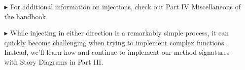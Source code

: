\begin{itemize}
\item[$\blacktriangleright$] For additional information on injections, check out Part IV Miscellaneous of the handbook.

\vspace{0.5cm}

\item[$\blacktriangleright$] While injecting in either direction is a remarkably simple process, it can quickly become challenging when trying to implement
complex functions. Instead, we'll learn how and continue to implement our method signatures with Story Diagrams in Part III.

 
\end{itemize}
